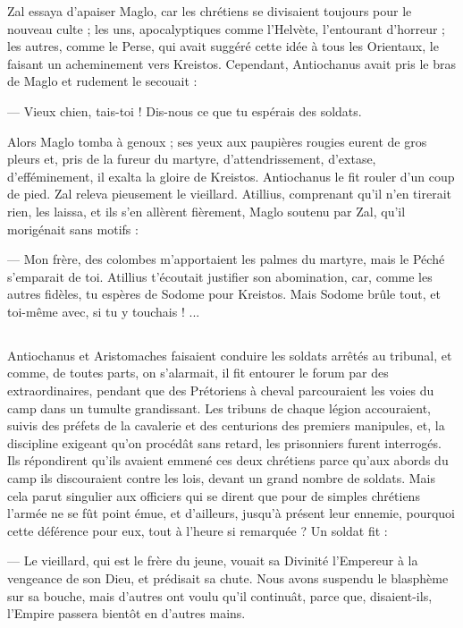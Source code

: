 \documentclass[a4paper, 11pt, oneside, polutonikogreek, french]{article}
\begin{document}
Zal essaya d'apaiser Maglo, car les chrétiens se divisaient toujours pour le nouveau culte ; les uns, apocalyptiques comme l'Helvète, l'entourant d'horreur ; les autres, comme le Perse, qui avait suggéré cette idée à tous les Orientaux, le faisant un acheminement vers Kreistos. Cependant, Antiochanus avait pris le bras de Maglo et rudement le secouait :

--- Vieux chien, tais-toi ! Dis-nous ce que tu espérais des soldats.

Alors Maglo tomba à genoux ; ses yeux aux paupières rougies eurent de gros pleurs et, pris de la fureur du martyre, d'attendrissement, d'extase, d'efféminement, il exalta la gloire de Kreistos. Antiochanus le fit rouler d'un coup de pied. Zal releva pieusement le vieillard. Atillius, comprenant qu'il n'en tirerait rien, les laissa, et ils s'en allèrent fièrement, Maglo soutenu par Zal, qu'il morigénait sans motifs :

--- Mon frère, des colombes m'apportaient les palmes du martyre, mais le Péché s'emparait de toi. Atillius t'écoutait justifier son abomination, car, comme les autres fidèles, tu espères de Sodome pour Kreistos. Mais Sodome brûle tout, et toi-même avec, si tu y touchais ! ...
\clearpage
\subsection{}
\paragraph{}
Antiochanus et Aristomaches faisaient conduire les soldats arrêtés au tribunal, et comme, de toutes parts, on s'alarmait, il fit entourer le forum par des extraordinaires, pendant que des Prétoriens à cheval parcouraient les voies du camp dans un tumulte grandissant. Les tribuns de chaque légion accouraient, suivis des préfets de la cavalerie et des centurions des premiers manipules, et, la discipline exigeant qu'on procédât sans retard, les prisonniers furent interrogés. Ils répondirent qu'ils avaient emmené ces deux chrétiens parce qu'aux abords du camp ils discouraient contre les lois, devant un grand nombre de soldats. Mais cela parut singulier aux officiers qui se dirent que pour de simples chrétiens l'armée ne se fût point émue, et d'ailleurs, jusqu'à présent leur ennemie, pourquoi cette déférence pour eux, tout à l'heure si remarquée ? Un soldat fit :

--- Le vieillard, qui est le frère du jeune, vouait sa Divinité l'Empereur à la vengeance de son Dieu, et prédisait sa chute. Nous avons suspendu le blasphème sur sa bouche, mais d'autres ont voulu qu'il continuât, parce que, disaient-ils, l'Empire passera bientôt en d'autres mains.
\end{document}
